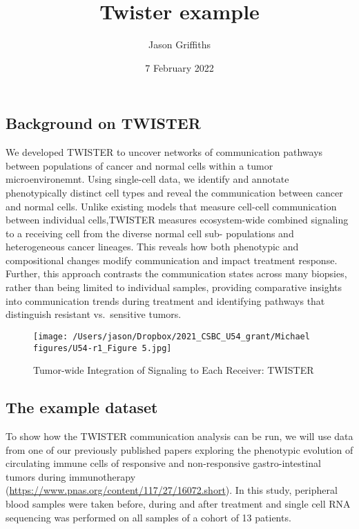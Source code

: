 \documentclass[
]{article}
\title{Twister example}
\author{Jason Griffiths}
\date{7 February 2022}
\begin{document}
\maketitle

\hypertarget{background-on-twister}{%
\subsection{Background on TWISTER}\label{background-on-twister}}

We developed TWISTER to uncover networks of communication pathways
between populations of cancer and normal cells within a tumor
microenvironemnt. Using single-cell data, we identify and annotate
phenotypically distinct cell types and reveal the communication between
cancer and normal cells. Unlike existing models that measure cell-cell
communication between individual cells,TWISTER measures ecosystem-wide
combined signaling to a receiving cell from the diverse normal cell sub-
populations and heterogeneous cancer lineages. This reveals how both
phenotypic and compositional changes modify communication and impact
treatment response. Further, this approach contrasts the communication
states across many biopsies, rather than being limited to individual
samples, providing comparative insights into communication trends during
treatment and identifying pathways that distinguish resistant
vs.~sensitive tumors.

\begin{figure}
\centering
\texttt{[image: /Users/jason/Dropbox/2021\_CSBC\_U54\_grant/Michael figures/U54-r1\_Figure 5.jpg]}
\caption{Tumor-wide Integration of Signaling to Each Receiver: TWISTER}
\end{figure}

\hypertarget{the-example-dataset}{%
\subsection{The example dataset}\label{the-example-dataset}}

To show how the TWISTER communication analysis can be run, we will use
data from one of our previously published papers exploring the
phenotypic evolution of circulating immune cells of responsive and
non-responsive gastro-intestinal tumors during immunotherapy
(\url{https://www.pnas.org/content/117/27/16072.short}). In this study,
peripheral blood samples were taken before, during and after treatment
and single cell RNA sequencing was performed on all samples of a cohort
of 13 patients.
\end{document}
